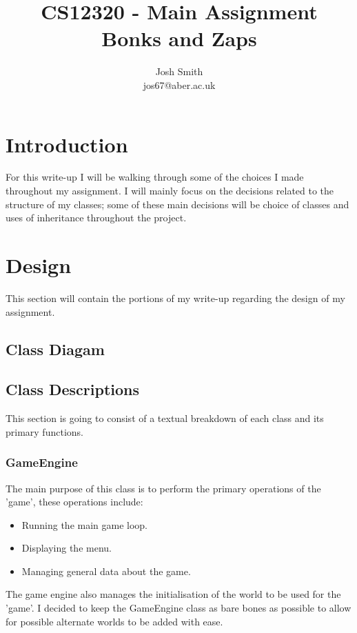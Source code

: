 \documentclass[12pt]{article}
\title{\textbf{CS12320 - Main Assignment\\
				Bonks and Zaps}}
\author{Josh Smith\\
		jos67@aber.ac.uk}
\date{}
\begin{document}
\maketitle
\newpage

\tableofcontents

\newpage


\section{Introduction}
For this write-up I will be walking through some of the choices I made throughout my assignment. I will mainly focus on the decisions related to the structure of my classes; some of these main decisions will be choice of classes and uses of inheritance throughout the project.

\section{Design}
This section will contain the portions of my write-up regarding the design of my assignment.

\subsection{Class Diagam}

\subsection{Class Descriptions}
This section is going to consist of a textual breakdown of each class and its primary functions.

\subsubsection{GameEngine}
The main purpose of this class is to perform the primary operations of the 'game', these operations include:
\begin{itemize}
	\item Running the main game loop.
	\item Displaying the menu.
	\item Managing general data about the game.
\end{itemize}
The game engine also manages the initialisation of the world to be used for the 'game'. I decided to keep the GameEngine class as bare bones as possible to allow for possible alternate worlds to be added with ease. \\
\end{document}

